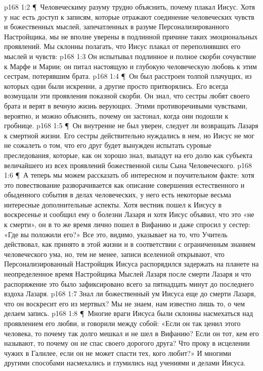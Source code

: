 \vs p168 1:2 \P\ Человеческиму разуму трудно объяснить, почему плакал Иисус. Хотя у нас есть доступ к записям, которые отражают соединение человеческих чувств и божественных мыслей, запечатленных в разуме Персонализированного Настройщика, мы не вполне уверены в подлинной причине таких эмоциональных проявлений. Мы склонны полагать, что Иисус плакал от переполнявших его мыслей и чувств:
\vs p168 1:3 \bibnobreakspace Он испытывал подлинное и полное скорби сочувствие к Марфе и Марии; он питал настоящую и глубокую человеческую любовь к этим сестрам, потерявшим брата.
\vs p168 1:4 \P\ \bibnobreakspace Он был расстроен толпой плачущих, из которых одни были искренни, а другие просто притворялись. Его всегда возмущали эти проявления показной скорби. Он знал, что сестры любят своего брата и верят в вечную жизнь верующих. Этими противоречивыми чувствами, вероятно, и можно объяснить, почему он застонал, когда они подошли к гробнице.
\vs p168 1:5 \P\ \bibnobreakspace Он внутренне не был уверен, следует ли возвращать Лазаря к смертной жизни. Его сестры действительно нуждались в нем, но Иисус не мог не сожалеть о том, что его друг будет вынужден испытать суровые преследования, которые, как он хорошо знал, выпадут на его долю как субъекта величайшего из всех проявлений божественной силы Сына Человеческого.
\vs p168 1:6 \P\ А теперь мы можем рассказать об интересном и поучительном факте: хотя это повествование разворачивается как описание совершения естественного и обыденного события в делах человеческих, у него есть некоторые весьма интересные дополнительные аспекты. Хотя вестник пошел к Иисусу в воскресенье и сообщил ему о болезни Лазаря и хотя Иисус объявил, что это «не к смерти», он в то же время лично пошел в Вифанию и даже спросил у сестер: «Где вы положили его?» Все это, видимо, указывает на то, что Учитель действовал, как принято в этой жизни и в соответствии с ограниченным знанием человеческого ума, но, тем не менее, записи вселенной открывают, что Персонализированный Настройщик Иисуса распорядился задержать на планете на неопределенное время Настройщика Мыслей Лазаря после смерти Лазаря и что распоряжение это было зафиксировано всего за пятнадцать минут до последнего вздоха Лазаря.
\vs p168 1:7 Знал ли божественный ум Иисуса еще до смерти Лазаря, что он воскресит его из мертвых? Мы не знаем, нам известно лишь то, о чем делаем запись.
\vs p168 1:8 \P\ Многие враги Иисуса были склонны насмехаться над проявлением его любви, и говорили между собой: «Если он так ценил этого человека, то почему так долго мешкал и не шел в Вифанию? Если он тот, кем его называют, то почему он не спас своего дорогого друга? Что проку в исцелении чужих в Галилее, если он не может спасти тех, кого любит?» И многими другими способами насмехались и глумились над учениями и делами Иисуса.
